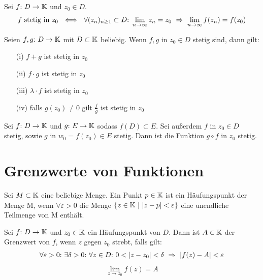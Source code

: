 \begin{framedthm}[Folgenkriterium]
	Sei $f{:}\  D \to \mathbb{K}$ und $z_0 \in D$.
	\begin{align*}
		f \textrm{ stetig in } z_0 \ \iff \ \forall (z_n)_{n\geq 1} \subset D{:}\  \lim_{n \to \infty} z_n = z_0 \ \Rightarrow\ \lim_{n \to \infty} f(z_n) = f(z_0)
	\end{align*}
\end{framedthm}

\begin{framedthm}
	Seien $f,g{:}\  D \to \mathbb{K}$ mit $D \subset \mathbb{K}$ beliebig. Wenn $f,g$ in $z_0 \in D$ stetig sind, dann gilt:
	\begin{enumerate}
		\item[(i)] $f+g$ ist stetig in $z_0$
		\item[(ii)] $f\cdot g$ ist stetig in $z_0$
		\item[(iii)] $\lambda\cdot f$ ist stetig in $z_0$
		\item[(iv)] falls $g(z_0) \neq 0$ gilt $\frac{f}{g}$ ist stetig in $z_0$
	\end{enumerate}
\end{framedthm}

\begin{framedthm}
	Sei $f{:}\  D \to \mathbb{K}$ und $g{:}\  E \to \mathbb{K}$ sodass $f(D) \subset E$. Sei außerdem $f$ in $z_0 \in D$ stetig, sowie $g$ in $w_0 = f(z_0) \in E$ stetig. Dann ist die Funktion $g \circ f$ in $z_0$ stetig.
\end{framedthm}

\section{Grenzwerte von Funktionen}

\begin{frameddefn}
	Sei $M \subset \mathbb{K}$ eine beliebige Menge. Ein Punkt $p \in \mathbb{K}$ ist ein Häufungspunkt der Menge M, wenn $\forall \varepsilon > 0$ die Menge $\{z \in \mathbb{K}\ |\ |z-p| < \varepsilon\}$ eine unendliche Teilmenge von M enthält.
\end{frameddefn}

\begin{frameddefn}
	Sei $f{:}\  D \to \mathbb{K}$ und $z_0 \in \mathbb{K}$ ein Häufungspunkt von $D$. Dann ist $A \in \mathbb{K}$ der Grenzwert von $f$, wenn $z$ gegen $z_0$ strebt, falls gilt:
	\begin{align*}
		\forall \varepsilon > 0{:}\  \exists \delta > 0{:}\  \forall z \in D{:}\  0 < |z-z_0| < \delta \ \Rightarrow\ |f(z) - A| < \varepsilon
	\end{align*}
	\begin{align*}
		\lim_{z \to z_0} f(z) = A
	\end{align*}
\end{frameddefn}


